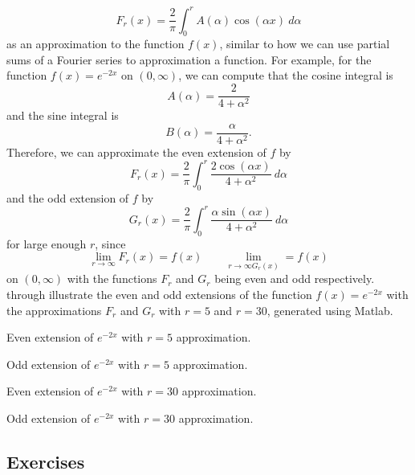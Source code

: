 \[ F_r(x) = \frac{2}{\pi} \int_0^r A(\alpha)\cos(\alpha x)\ d\alpha \] as an approximation to the function $f(x)$, similar to how we can use partial sums of a Fourier series to approximation a function. For example, for the function $f(x) = e^{-2x}$ on $(0, \infty)$, we can compute that the cosine integral is
\[ A(\alpha) = \frac{2}{4+\alpha^2} \] and the sine integral is 
\[ B(\alpha) = \frac{\alpha}{4+\alpha^2}.\] Therefore, we can approximate the even extension of $f$ by 
\[ F_r(x) = \frac{2}{\pi} \int_0^r \frac{2 \cos(\alpha x)}{4+\alpha^2}\ d\alpha \] and the odd extension of $f$ by
\[ G_r(x) = \frac{2}{\pi} \int_0^r \frac{\alpha \sin(\alpha x)}{4 + \alpha^2}\ d\alpha \] for large enough $r$, since \[ \lim_{r\rightarrow \infty} F_r(x) = f(x) \qquad \lim_{r\rightarrow \infty G_r(x)} = f(x) \] on $(0,\infty)$ with the functions $F_r$ and $G_r$ being even and odd respectively.  through  illustrate the even and odd extensions of the function $f(x) = e^{-2x}$ with the approximations $F_r$ and $G_r$ with $r=5$ and $r=30$, generated using Matlab. 

\begin{myfig}
\parbox[t]{2.5in}{\capstart%
 \caption{Even extension of $e^{-2x}$ with $r=5$ approximation. \label{fig:even5Graph}} 
 }
\quad \qquad
\parbox[t]{2.5in}{ \capstart
 \caption{Odd extension of $e^{-2x}$ with $r=5$ approximation.\label{fig:odd5Graph}}
}
\end{myfig}

\begin{myfig}
\parbox[t]{2.5in}{\capstart%
 \caption{Even extension of $e^{-2x}$ with $r=30$ approximation. \label{fig:even30Graph}} 
 }
\quad \qquad
\parbox[t]{2.5in}{ \capstart
 \caption{Odd extension of $e^{-2x}$ with $r=30$ approximation.\label{fig:odd30Graph}}
}
\end{myfig}



\subsection{Exercises}











